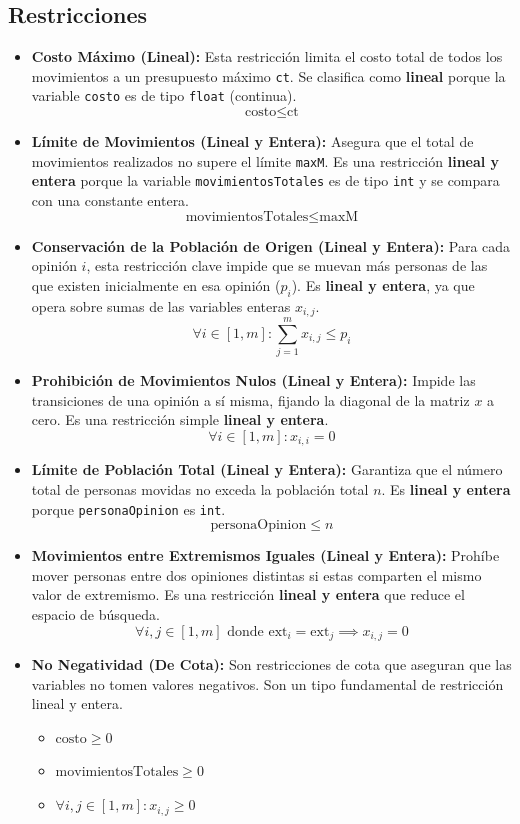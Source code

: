 \documentclass[11pt,letter]{article}
\begin{document}
\subsection{Restricciones}
\begin{itemize}
    \item \textbf{Costo Máximo (Lineal):}
    Esta restricción limita el costo total de todos los movimientos a un presupuesto máximo \texttt{ct}. Se clasifica como \textbf{lineal} porque la variable \texttt{costo} es de tipo \texttt{float} (continua).
    $$
    \text{costo} \le \text{ct}
    $$

    \item \textbf{Límite de Movimientos (Lineal y Entera):}
    Asegura que el total de movimientos realizados no supere el límite \texttt{maxM}. Es una restricción \textbf{lineal y entera} porque la variable \texttt{movimientosTotales} es de tipo \texttt{int} y se compara con una constante entera.
    $$
    \text{movimientosTotales} \le \text{maxM}
    $$

    \item \textbf{Conservación de la Población de Origen (Lineal y Entera):}
    Para cada opinión $i$, esta restricción clave impide que se muevan más personas de las que existen inicialmente en esa opinión ($p_i$). Es \textbf{lineal y entera}, ya que opera sobre sumas de las variables enteras $x_{i,j}$.
    $$
    \forall i \in [1, m]: \sum_{j=1}^{m} x_{i,j} \le p_i
    $$

    \item \textbf{Prohibición de Movimientos Nulos (Lineal y Entera):}
    Impide las transiciones de una opinión a sí misma, fijando la diagonal de la matriz $x$ a cero. Es una restricción simple \textbf{lineal y entera}.
    $$
    \forall i \in [1, m]: x_{i,i} = 0
    $$

    \item \textbf{Límite de Población Total (Lineal y Entera):}
    Garantiza que el número total de personas movidas no exceda la población total $n$. Es \textbf{lineal y entera} porque \texttt{personaOpinion} es \texttt{int}.
    $$
    \text{personaOpinion} \le n
    $$

    \item \textbf{Movimientos entre Extremismos Iguales (Lineal y Entera):}
    Prohíbe mover personas entre dos opiniones distintas si estas comparten el mismo valor de extremismo. Es una restricción \textbf{lineal y entera} que reduce el espacio de búsqueda.
    $$
    \forall i, j \in [1, m] \text{ donde } \text{ext}_i = \text{ext}_j \implies x_{i,j} = 0
    $$

    \item \textbf{No Negatividad (De Cota):}
    Son restricciones de cota que aseguran que las variables no tomen valores negativos. Son un tipo fundamental de restricción lineal y entera.
    \begin{itemize}
        \item $\text{costo} \ge 0$
        \item $\text{movimientosTotales} \ge 0$
        \item $\forall i, j \in [1, m]: x_{i,j} \ge 0$
    \end{itemize}
\end{itemize}
\end{document}
